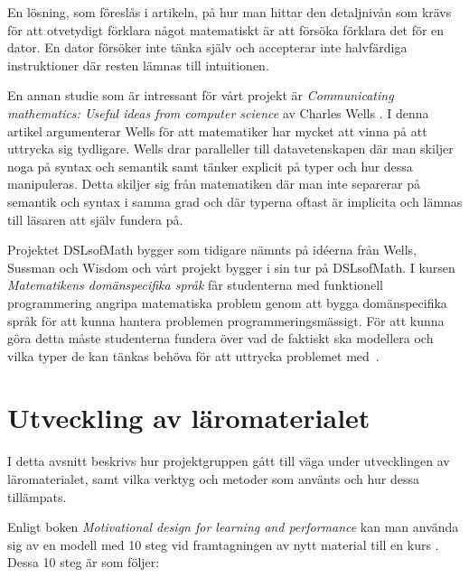 \documentclass[12pt,a4paper,twoside,openright]{article}
\begin{document}
En lösning, som föreslås i artikeln, på hur man hittar den
detaljnivån som krävs för att otvetydigt förklara något matematiskt är
att försöka förklara det för en dator. En dator försöker inte tänka
själv och accepterar inte halvfärdiga instruktioner där resten lämnas
till intuitionen.

En annan studie som är intressant för vårt projekt är
\textit{Communicating mathematics: Useful ideas from computer science}
av Charles Wells \cite{wells1995communicating}. I denna artikel
argumenterar Wells för att matematiker har mycket att vinna på att
uttrycka sig tydligare. Wells
drar paralleller till datavetenskapen där man skiljer noga på syntax
och semantik samt tänker explicit på typer och hur dessa
manipuleras. Detta skiljer sig från matematiken där man inte separerar
på semantik och syntax i samma grad och där typerna oftast är
implicita och lämnas till läsaren att själv fundera på.

Projektet DSLsofMath bygger som tidigare nämnts på idéerna från Wells,
Sussman och Wisdom och vårt projekt bygger i sin tur på DSLsofMath.
I kursen \textit{Matematikens domänspecifika
 språk} får studenterna med funktionell programmering angripa
matematiska problem genom att bygga domänspecifika språk för att kunna
hantera problemen programmeringsmässigt. För att kunna göra detta
måste studenterna fundera över vad de faktiskt ska modellera och vilka
typer de kan tänkas behöva för att uttrycka problemet
med~\cite{kursplan:dslsofmath}.

\newpage

\section{Utveckling av läromaterialet}
\label{sec:utveckling}



I detta avsnitt beskrivs hur projektgruppen gått till väga under
utvecklingen av läromaterialet, samt vilka verktyg och metoder som
använts och hur dessa tillämpats.

Enligt boken \textit{Motivational design for learning and performance}
kan man använda sig av en modell med 10 steg vid framtagningen av nytt
material till en kurs \cite{motivational_design}. Dessa 10 steg är som följer:
\end{document}
